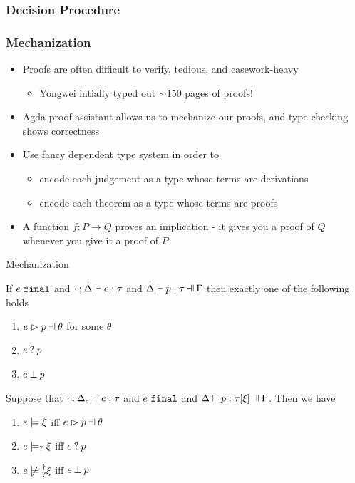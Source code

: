 \documentclass{beamer}
\begin{document}
\begin{frame}
	\frametitle{Decision Procedure}
	
\end{frame}

\begin{frame}
\frametitle{Mechanization}
\begin{itemize}
\item Proofs are often difficult to verify, tedious, and casework-heavy
\medskip
\begin{itemize}
	\item Yongwei intially typed out $\sim 150$ pages of proofs!
\end{itemize}
\medskip
\item Agda proof-assistant allows us to mechanize our proofs, and type-checking shows correctness
\medskip
\item Use fancy dependent type system in order to
\medskip
\begin{itemize}
	\item encode each judgement as a type whose terms are derivations
	\medskip
	\item encode each theorem as a type whose terms are proofs
\end{itemize}
\medskip
\item A function $f : P \to Q$ proves an implication - it gives you a proof of $Q$ whenever you give it a proof of $P$
\end{itemize}
\end{frame}

\begin{frame}{Mechanization}
\begin{lemma}
	\label{lemma:match-determinism}
	If $e ~\mathtt{final}$ and $\cdot \mathbin{;} \Delta \vdash e : \tau$ and $\hpattyp{p}{\tau}{\Gamma}{\Delta}$ then exactly one of the following holds
	\begin{enumerate}
		\item $\hpatmatch{e}{p}{\theta}$ for some $\theta$
		\item $e \mathbin{?} p$
		\item $e \mathbin{\bot} p$
	\end{enumerate}
\end{lemma}

\begin{lemma}
	\label{lemma:const-matching-coherence}
	Suppose that $\cdot \mathbin{;} \Delta_e \vdash e : \tau$ and $e ~\mathtt{final}$ and $\chpattyp{p}{\tau}{\xi}{\Gamma}{\Delta}$. Then we have
	\begin{enumerate}
		\item $e \models \xi$ iff $\hpatmatch{e}{p}{\theta}$
		\item $e \models_{?} \xi$ iff $e \mathbin{?} p$
		\item $\cnotsatisfyormay{e}{\xi}$ iff $e \mathbin{\bot} p$
	\end{enumerate}
\end{lemma}
\end{frame}
\end{document}
